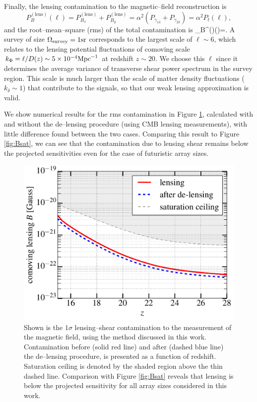 Finally, the lensing contamination to the magnetic--field reconstruction is
\begin{equation}
P_B^{(\text{lens})}(\ell)=P^{(\text{lens})}_{B_x}+P^{(\text{lens})}_{B_y}=\alpha^2 (P_{\gamma_{13}}+P_{\gamma_{23}})=\alpha^2 P_t(\ell),
\end{equation}
and the root--mean--square (rms) of the total contamination is
\beq
\Delta_B^{()}(\ell)=.
\eeq
A survey of size $\Omega_{\rm survey}=1{\rm sr}$ corresponds to the largest scale of $\ell\sim 6$, which relates to the lensing potential fluctuations of comoving scale $k_\Phi=\ell/D(z)\sim 5\times 10^{-4}{\rm Mpc}^{-1}$ at redshift $z\sim 20$. We choose this $\ell$ since it determines the average variance of transverse shear power spectrum in the survey region. This scale is much larger than the scale of matter density fluctuations ($k_\delta\sim 1$) that contribute to the signals, so that our weak lensing approximation is valid.

We show numerical results for the rms contamination in Figure \ref{fig:lensing_B}, calculated with and without the de--lensing procedure (using CMB lensing measurements), with little difference found between the two cases. Comparing this result to Figure \ref{fig:Bsat}, we can see that the contamination due to lensing shear remains below the projected sensitivities even for the case of futuristic array sizes.
\begin{figure}[h]
\centering
\includegraphics[scale=0.4]{delensingB.pdf}
\caption{Shown is the $1\sigma$ lensing--shear contamination to the measurement of the magnetic field, using the method discussed in this work. Contamination before (solid red line) and after (dashed blue line) the de--lensing procedure, is presented as a function of redshift. Saturation ceiling is denoted by the shaded region above the thin dashed line. Comparison with Figure \ref{fig:Bsat} reveals that lensing is below the projected sensitivity for all array sizes considered in this work.}
\label{fig:lensing_B}
\end{figure}

